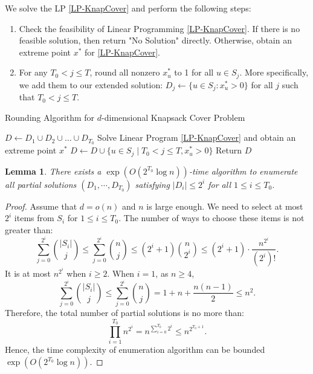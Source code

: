\documentclass[11pt,a4paper]{article} \usepackage{enumitem}
\newtheorem{lemma}[theorem]{Lemma}
\theoremstyle{definition}
\begin{document}
We solve the LP \cref{LP-KnapCover} and perform the following steps:

\begin{enumerate}
    \item Check the feasibility of 
    Linear Programming \cref{LP-KnapCover}. If there is no feasible solution, then return "No Solution" directly. 
    Otherwise, obtain an extreme point $x^{*}$ for \cref{LP-KnapCover}.

    \item For any $T_0< j\leq T$, round 
    all nonzero $x^{*}_u$ to 1 for all $u \in S_j$. More specifically, we add them to our extended solution: $D_j \gets \{u \in S_j : x^{*}_u > 0\}$ for all $j$ such that $T_0 < j \leq T$.
\end{enumerate}

\begin{algorithm}
\caption{Rounding Algorithm for $d$-dimensional Knapsack Cover Problem} \label{Algo-IR-Knap}
$D \gets D_1 \cup D_2 \cup \dots \cup D_{T_0}$\;
Solve Linear Program \cref{LP-KnapCover} and obtain an extreme point $x^{*}$\;
$D \gets D \cup \{u \in S_j \mid T_0 < j\leq T, x^{*}_u > 0\}$\;
Return $D$\;
\end{algorithm}

\begin{lemma} \label{lem:Knap-2}
There exists a $\exp(O(2^{T_0}\log n))$-time algorithm to enumerate all partial solutions $(D_1, \cdots, D_{T_0})$ satisfying $|D_i| \le 2^i$ for all $1 \le i \le T_0$. 
\end{lemma}
\begin{proof}
Assume that $d=o(n)$ and $n$ is large enough. We need to select at most $2^i$ items from $S_i$ for $1\leq i\leq T_0$. The number of ways to choose these items is not greater than: 
\[
\sum_{j=0}^{2^i} \binom{|S_i|}{j} \leq \sum_{j=0}^{2^i} \binom{n}{j}\leq (2^i+1)\binom{n}{2^i}\leq (2^i+1)\cdot\frac{n^{2^i}}{(2^i)!}.
\]
It is at most $n^{2^i}$ when $i\geq 2$. When $i=1$, as $n\geq 4$,
\[
\sum_{j=0}^{2^i} \binom{|S_i|}{j} \leq \sum_{j=0}^{2^i} \binom{n}{j}=1+n+\frac{n(n-1)}{2}\leq n^2.
\]
Therefore, the total number of partial solutions is no more than:
\[
\prod_{i=1}^{T_0} n^{2^i} = n^{\sum_{i=0}^{T_0} 2^i} \le n^{2^{T_0+1}}.
\]
Hence, the time complexity of enumeration 
algorithm can be bounded $\exp(O(2^{T_0}\log n))$.
\end{proof}
\end{document}

